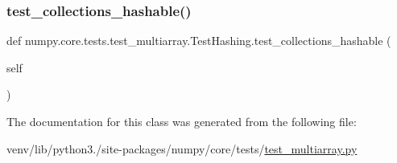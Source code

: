 \mbox{\label{classnumpy_1_1core_1_1tests_1_1test__multiarray_1_1TestHashing_a3a6c94e5455e57ee7952b289c2f0f323}} 
\subsubsection{\texorpdfstring{test\+\_\+collections\+\_\+hashable()}{test\_collections\_hashable()}}
{\footnotesize\ttfamily def numpy.\+core.\+tests.\+test\+\_\+multiarray.\+Test\+Hashing.\+test\+\_\+collections\+\_\+hashable (\begin{DoxyParamCaption}\item[{}]{self }\end{DoxyParamCaption})}



The documentation for this class was generated from the following file\+:\begin{DoxyCompactItemize}
\item 
venv/lib/python3./site-\/packages/numpy/core/tests/\hyperlink{core_2tests_2test__multiarray_8py}{test\+\_\+multiarray.\+py}\end{DoxyCompactItemize}
